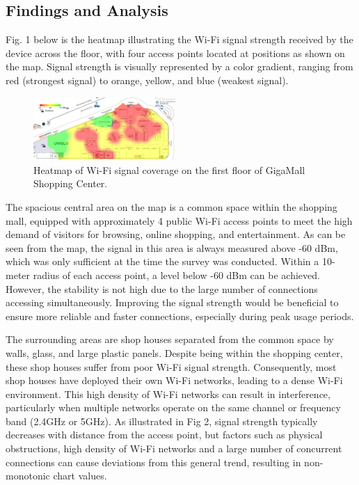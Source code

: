 \documentclass[conference]{IEEEtran}
\begin{document}
\subsection{Findings and Analysis}

Fig. 1 below is the heatmap illustrating the Wi-Fi signal strength received by the device across the floor, with four access points located at positions as shown on the map. Signal strength is visually represented by a color gradient, ranging from red (strongest signal) to orange, yellow, and blue (weakest signal).

\begin{figure}[htbp]
    \centering
    \includegraphics[width=0.48\textwidth]{fig1_heatmap.png}
    \caption{Heatmap of Wi-Fi signal coverage on the first floor of GigaMall Shopping Center.}
\end{figure}

The spacious central area on the map is a common space within the shopping mall, equipped with approximately 4 public Wi-Fi access points to meet the high demand of visitors for browsing, online shopping, and entertainment. As can be seen from the map, the signal in this area is always measured above -60 dBm, which was only sufficient at the time the survey was conducted. Within a 10-meter radius of each access point, a level below -60 dBm can be achieved. However, the stability is not high due to the large number of connections accessing simultaneously. Improving the signal strength would be beneficial to ensure more reliable and faster connections, especially during peak usage periods.

The surrounding areas are shop houses separated from the common space by walls, glass, and large plastic panels. Despite being within the shopping center, these shop houses suffer from poor Wi-Fi signal strength. Consequently, most shop houses have deployed their own Wi-Fi networks, leading to a dense Wi-Fi environment. This high density of Wi-Fi networks can result in interference, particularly when multiple networks operate on the same channel or frequency band (2.4GHz or 5GHz). As illustrated in Fig 2, signal strength typically decreases with distance from the access point, but factors such as physical obstructions, high density of Wi-Fi networks and a large number of concurrent connections can cause deviations from this general trend, resulting in non-monotonic chart values.
\end{document}
